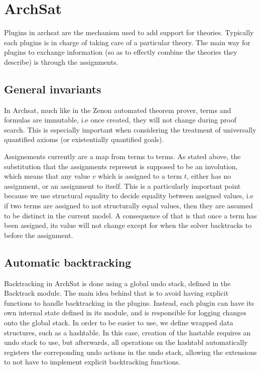 
\section{ArchSat}

Plugins in archsat are the mechanism used to add support for theories.
Typically each plugins is in charge of taking care of a particular theory.
The main way for plugins to exchange information (so as to effectly combine
the theories they describe) is through the assignments.

\subsection{General invariants}

In Archsat, much like in the Zenon automated theorem prover, terms and formulas
are immutable, i.e once created, they will not change during proof search.
This is especially important when considering the treatment of universally
quantified axioms (or existentially quantified goals).

Assignements currently are a map from terms to terms. As stated above, the
substitution that the assignments represent is supposed to be an involution,
which means that any value $v$ which is assigned to a term $t$, either has
no assignment, or an assignment to itself. This is a particularly important
point because we use structural equality to decide equality between assigned
values, i.e if two terms are assigned to not structurally equal values, then
they are assumed to be distinct in the current model.
A consequence of that is that once a term has been assigned, its value will
not change except for when the solver backtracks to before the assignment.

\subsection{Automatic backtracking}

Backtracking in ArchSat is done using a global undo stack, defined in the
Backtrack module. The main idea behind that is to avoid having explicit
functions to handle backtracking in the plugins. Instead, each plugin
can have its own internal state defined in its module, and is responsible for
logging changes onto the global stack. In order to be easier to use,
we define wrapped data structures, such as a hashtable. In this case, creation
of the hastable requires an undo stack to use, but afterwards, all operations
on the hashtabl automatically registers the correponding undo actions in
the undo stack, allowing the extensions to not have to implement explicit
backtracking functions.

